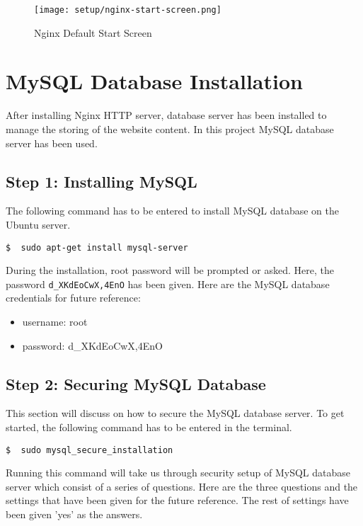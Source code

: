 \begin{figure}[h]
\caption{Nginx Default Start Screen}
\label{fig:nginx-start-screen}
\centering
\texttt{[image: setup/nginx-start-screen.png]}
\end{figure}


\section{MySQL Database Installation} \label{sec:mysql-database-installation}
After installing Nginx HTTP server, database server has been installed to manage the storing of the website content. In this project MySQL database server has been used.

\subsection{Step 1: Installing MySQL}
The following command has to be entered to install MySQL database on the Ubuntu server. 
\begin{lstlisting}
$  sudo apt-get install mysql-server
\end{lstlisting}

During the installation, root password will be prompted or asked. Here, the password \texttt{d\_XKdEoCwX,4EnO} has been given. Here are the MySQL database credentials for future reference:
\begin{itemize}
\item username: root
\item password: d\_XKdEoCwX,4EnO
\end{itemize}

\subsection{Step 2: Securing MySQL Database}
This section will discuss on how to secure the MySQL database server. To get started, the following command has to be entered in the terminal.
\begin{lstlisting}
$  sudo mysql_secure_installation
\end{lstlisting}

Running this command will take us through security setup of MySQL database server which consist of a series of questions. Here are the three questions and the settings that have been given for the future reference. The rest of settings have been given 'yes' as the answers.

